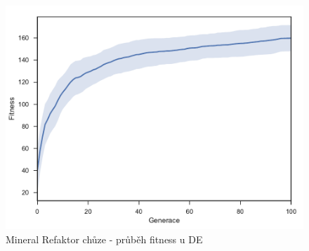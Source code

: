 \begin{figure}[h]\centering
	\includegraphics[width=\columnwidth]{../img/MineralMap/MineralRefaktorWalk}
	\caption{Mineral Refaktor chůze - průběh fitness u DE}
	\label{obr04:MineralRefaktorWalk}
\end{figure}
\clearpage
